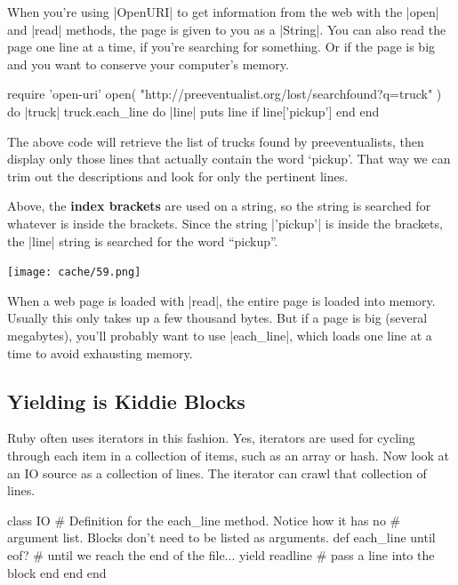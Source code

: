 \documentclass[12pt,twoside]{report}
\begin{document}
When you're using \rubyinline|OpenURI| to get
information from the web with the \rubyinline|open|
and \rubyinline|read| methods, the page is given to
you as a \rubyinline|String|.  You can also read the
page one line at a time, if you're searching for something.  Or if the
page is big and you want to conserve your computer's memory.


\begin{rubycode}

 require 'open-uri'
 open( "http://preeventualist.org/lost/searchfound?q=truck" ) do |truck|
   truck.each_line do |line|
     puts line if line['pickup']
   end
 end

\end{rubycode}


The above code will retrieve the list of trucks found by
preeventualists, then display only those lines that actually contain
the word `pickup'. That way we can trim out the descriptions and look
for only the pertinent lines.

Above, the {\bf index brackets} are used on a string, so the string is
searched for whatever is inside the brackets.  Since the string
\rubyinline|'pickup'| is inside the brackets, the
\rubyinline|line| string is searched for the word
``pickup''.

	\texttt{[image: cache/59.png]}

When a web page is loaded with \rubyinline|read|, the
entire page is loaded into memory.  Usually this only takes up a few
thousand bytes.  But if a page is big (several megabytes), you'll
probably want to use \rubyinline|each_line|, which
loads one line at a time to avoid exhausting memory.



\subsection{Yielding is Kiddie Blocks}



Ruby often uses iterators in this fashion.  Yes, iterators are used
for cycling through each item in a collection of items, such as an
array or hash.  Now look at an IO source as a collection of lines.
The iterator can crawl that collection of lines.


\begin{rubycode}

 class IO
   # Definition for the each_line method.  Notice how it has no
   # argument list.  Blocks don't need to be listed as arguments.
   def each_line
     until eof?        # until we reach the end of the file...
       yield readline  # pass a line into the block
     end
   end
 end

\end{rubycode}
\end{document}
